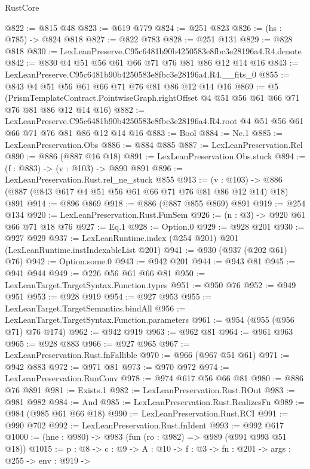 \begin{lexlean}{RustCore}
\begin{coremodule}
@822 := @815 @48
@823 := @619 @779
@824 := @251 @823
@826 := (hs : @785) -> @824 @818
@827 := @822 @783
@828 := @251 @131
@829 := @828 @818
@830 := LexLeanPreserve.C95c6481b90b4250583e8fbc3e28196a4.R4.denote
@842 := @830 @4 @51 @56 @61 @66 @71 @76 @81 @86 @12 @14 @16
@843 := LexLeanPreserve.C95c6481b90b4250583e8fbc3e28196a4.R4.__fits_0
@855 := @843 @4 @51 @56 @61 @66 @71 @76 @81 @86 @12 @14 @16
@869 := @5
    (PrismTemplateContract.PointwiseGraph.rightOffset
      @4
      @51
      @56
      @61
      @66
      @71
      @76
      @81
      @86
      @12
      @14
      @16)
@882 := LexLeanPreserve.C95c6481b90b4250583e8fbc3e28196a4.R4.root
    @4
    @51
    @56
    @61
    @66
    @71
    @76
    @81
    @86
    @12
    @14
    @16
@883 := Bool
@884 := Ne.{1}
@885 := LexLeanPreservation.Obs
@886 := @884 @885
@887 := LexLeanPreservation.Rel
@890 := @886 (@887 @16 @18)
@891 := LexLeanPreservation.Obs.stuck
@894 := (f : @883) -> (v : @103) -> @890 @891
@896 := LexLeanPreservation.Rust.rel_ne_stuck @855
@913 := (v : @103) -> @886 (@887 (@843 @617 @4 @51 @56 @61 @66 @71 @76 @81 @86 @12 @14) @18) @891
@914 := @896 @869
@918 := @886 (@887 @855 @869) @891
@919 := @254 @134
@920 := LexLeanPreservation.Rust.FunSem
@926 := (n : @3) -> @920 @61 @66 @71 @18 @76
@927 := Eq.{1}
@928 := Option.{0}
@929 := @928 @201
@930 := @927 @929
@937 := LexLeanRuntime.index (@254 @201) @201 (LexLeanRuntime.instIndexableList @201)
@941 := @930 (@937 (@202 @61) @76)
@942 := Option.some.{0}
@943 := @942 @201
@944 := @943 @81
@945 := @941 @944
@949 := @226 @56 @61 @66 @81
@950 := LexLeanTarget.TargetSyntax.Function.types
@951 := @950 @76
@952 := @949 @951
@953 := @928 @919
@954 := @927 @953
@955 := LexLeanTarget.TargetSemantics.bindAll
@956 := LexLeanTarget.TargetSyntax.Function.parameters
@961 := @954 (@955 (@956 @71) @76 @174)
@962 := @942 @919
@963 := @962 @81
@964 := @961 @963
@965 := @928 @883
@966 := @927 @965
@967 := LexLeanPreservation.Rust.fnFallible
@970 := @966 (@967 @51 @61)
@971 := @942 @883
@972 := @971 @81
@973 := @970 @972
@974 := LexLeanPreservation.RunConv
@978 := @974 @617 @56 @66 @81
@980 := @886 @76 @891
@981 := Exists.{1}
@982 := LexLeanPreservation.Rust.ROut
@983 := @981 @982
@984 := And
@985 := LexLeanPreservation.Rust.RealizesFn
@989 := @984 (@985 @61 @66 @18)
@990 := LexLeanPreservation.Rust.RCI
@991 := @990 @702
@992 := LexLeanPreservation.Rust.fnIdent
@993 := @992 @617
@1000 := (hne : @980) -> @983 (fun (ro : @982) => @989 (@991 @993 @51 @18))
@1015 := {p : @8} ->
  {c : @9} ->
  {A : @10} ->
  {f : @3} ->
  {fn : @201} ->
  {args : @255} ->
  {env : @919} ->

\end{coremodule}
\end{lexlean}

